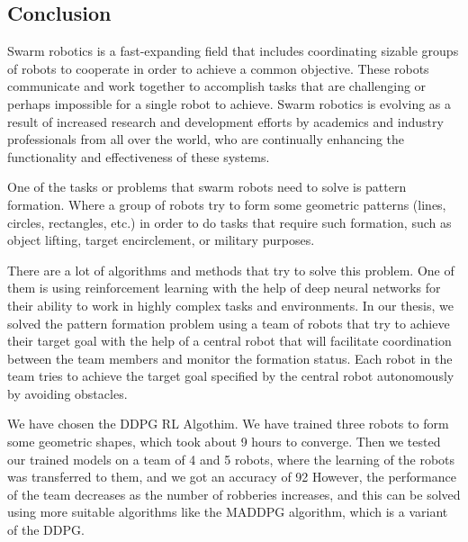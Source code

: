\documentclass[12pt]{extarticle}
\begin{document}
\afterpage{\clearpage}
 \newpage
\pagebreak
\hspace{0pt}
\vfill
\begin{center}
\section{Conclusion}
\end{center}
\vfill
\hspace{0pt}

\pagebreak




Swarm robotics is a fast-expanding field that includes coordinating sizable groups of robots to cooperate in order to achieve a common objective. These robots communicate and work together to accomplish tasks that are challenging or perhaps impossible for a single robot to achieve. Swarm robotics is evolving as a result of increased research and development efforts by academics and industry professionals from all over the world, who are continually enhancing the functionality and effectiveness of these systems.



One of the tasks or problems that swarm robots need to solve is pattern formation. Where a group of robots try to form some geometric patterns (lines, circles, rectangles, etc.) in order to do tasks that require such formation, such as object lifting, target encirclement, or military purposes.

There are a lot of algorithms and methods that try to solve this problem. One of them is using reinforcement learning with the help of deep neural networks for their ability to work in highly complex tasks and environments.
In our thesis, we solved the pattern formation problem using a team of robots that try to achieve their target goal with the help of a central robot that will facilitate coordination between the team members and monitor the formation status. Each robot in the team tries to achieve the target goal specified by the central robot autonomously by avoiding obstacles.


We have chosen the DDPG RL Algothim. We have trained three robots to form some geometric shapes, which took about 9 hours to converge.
Then we tested our trained models on a team of 4 and 5 robots, where the learning of the robots was transferred to them, and we got an accuracy of 92%
However, the performance of the team decreases as the number of robberies increases, and this can be solved using more suitable algorithms like the MADDPG algorithm, which is a variant of the DDPG.







\newpage


\end{document}
